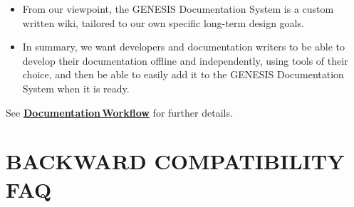 \documentclass[12pt]{article}
\begin{document}
\begin{enumerate}
\begin{itemize}
\item From our viewpoint, the GENESIS Documentation System is a custom
written wiki, tailored to our own specific long-term design goals.

\item In summary, we want developers and documentation writers to be able to develop their documentation offline and independently,
using tools of their choice, and then be able to easily add it to the GENESIS Documentation System when it is ready.

\end{itemize}

See \href{../documentation-workflow/documentation-workflow.tex}{\bf Documentation\,Workflow} for further details.

\end{enumerate}

\section*{BACKWARD COMPATIBILITY FAQ}



\end{document}

